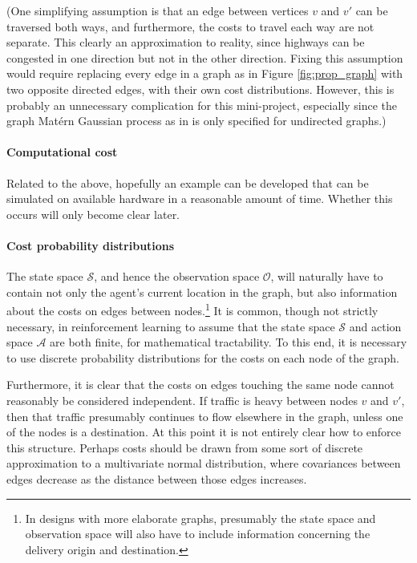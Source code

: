 (One simplifying assumption is that an edge between vertices $v$ and $v'$ can be traversed both ways, and furthermore, the costs to travel each way are not separate. This clearly an approximation to reality, since highways can be congested in one direction but not in the other direction. Fixing this assumption would require replacing every edge in a graph as in Figure \ref{fig:prop_graph} with two opposite directed edges, with their own cost distributions. However, this is probably an unnecessary complication for this mini-project, especially since the graph Mat\'{e}rn Gaussian process as in \cite{pmlr-v130-borovitskiy21a} is only specified for undirected graphs.)

\paragraph{Computational cost} Related to the above, hopefully an example can be developed that can be simulated on available hardware in a reasonable amount of time. Whether this occurs will only become clear later.

\paragraph{Cost probability distributions} The state space $\mathcal S$, and hence the observation space $\mathcal O$, will naturally have to contain not only the agent's current location in the graph, but also information about the costs on edges between nodes.\footnote{In designs with more elaborate graphs, presumably the state space and observation space will also have to include information concerning the delivery origin and destination.} It is common, though not strictly necessary, in reinforcement learning to assume that the state space $\mathcal S$ and action space $\mathcal A$ are both finite, for mathematical tractability. To this end, it is necessary to use discrete probability distributions for the costs on each node of the graph.

Furthermore, it is clear that the costs on edges touching the same node cannot reasonably be considered independent. If traffic is heavy between nodes $v$ and $v'$, then that traffic presumably continues to flow elsewhere in the graph, unless one of the nodes is a destination. At this point it is not entirely clear how to enforce this structure. Perhaps costs should be drawn from some sort of discrete approximation to a multivariate normal distribution, where covariances between edges decrease as the distance between those edges increases.

